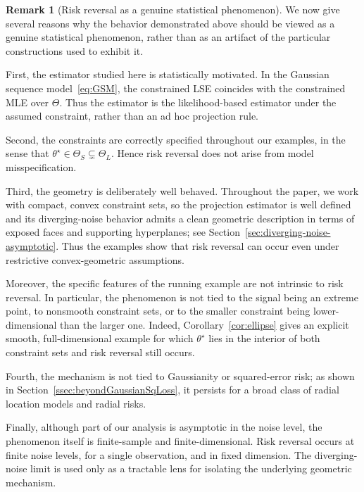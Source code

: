\documentclass[11pt]{article}
\theoremstyle{plain}
\theoremstyle{definition}
\newtheorem*{remark}{Remark}
\begin{document}
\begin{remark}[Risk reversal as a genuine statistical phenomenon]
We now give several reasons why the behavior demonstrated above should be
viewed as a genuine statistical phenomenon, rather than as an artifact of the
particular constructions used to exhibit it.

First, the estimator studied here is statistically motivated. In the Gaussian
sequence model~\eqref{eq:GSM}, the constrained LSE coincides with the
constrained MLE over $\Theta$. Thus the estimator is the likelihood-based
estimator under the assumed constraint, rather than an ad hoc projection rule.

Second, the constraints are correctly specified throughout our examples, in the
sense that $\theta^\star\in\Theta_S\subsetneq\Theta_L$. Hence risk reversal
does not arise from model misspecification.

Third, the geometry is deliberately well behaved. Throughout the paper, we work
with compact, convex constraint sets, so the projection estimator is well
defined and its diverging-noise behavior admits a clean geometric description in
terms of exposed faces and supporting hyperplanes; see
Section~\ref{sec:diverging-noise-asymptotic}. Thus the examples show that risk
reversal can occur even under restrictive convex-geometric assumptions.

Moreover, the specific features of the running example are not
intrinsic to risk reversal. In particular, the phenomenon is not tied to the
signal being an extreme point, to nonsmooth constraint sets, or to the smaller
constraint being lower-dimensional than the larger one. Indeed,
Corollary~\ref{cor:ellipse} gives an explicit smooth, full-dimensional example for which $\theta^\star$ lies in the interior of both constraint sets and risk reversal still occurs.

Fourth, the mechanism is not tied to Gaussianity or squared-error risk; as shown in Section~\ref{ssec:beyondGaussianSqLoss}, it persists for a broad class of radial location models and radial risks.

Finally, although part of our analysis is asymptotic in the noise level, the phenomenon itself is finite-sample and finite-dimensional. Risk reversal occurs at finite noise levels, for a single observation, and in fixed dimension. The diverging-noise limit is used only as a tractable lens for isolating the underlying geometric mechanism.
\end{remark}
\end{document}

